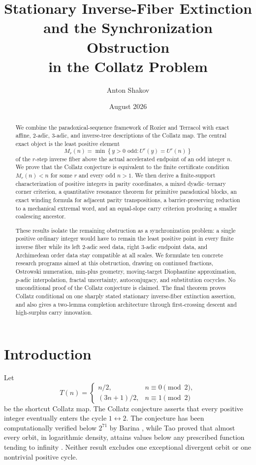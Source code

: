 \documentclass[11pt,reqno]{amsart}
\title[Stationary inverse-fiber extinction]
{Stationary Inverse-Fiber Extinction and the Synchronization Obstruction\\
in the Collatz Problem}
\author{Anton Shakov}
\date{August 2026}
\numberwithin{equation}{section}
\theoremstyle{definition}
\theoremstyle{remark}
\newcommand{\set}[1]{\left\{#1\right\}}
\begin{document}
\begin{abstract}
We combine the paradoxical-sequence framework of Rozier and Terracol with
exact affine, $2$-adic, $3$-adic, and inverse-tree descriptions of the
Collatz map.  The central exact object is the least positive element
\[
M_r(n)=\min\set{y>0\text{ odd}:U^r(y)=U^r(n)}
\]
of the $r$-step inverse fiber above the actual accelerated endpoint of an
odd integer $n$.  We prove that the Collatz conjecture is equivalent to the
finite certificate condition $M_r(n)<n$ for some $r$ and every odd $n>1$.
We then derive a finite-support characterization of positive integers in
parity coordinates, a mixed dyadic--ternary corner criterion, a quantitative
resonance theorem for primitive paradoxical blocks, an exact winding formula
for adjacent parity transpositions, a barrier-preserving reduction to a
mechanical extremal word, and an equal-slope carry criterion producing a
smaller coalescing ancestor.

These results isolate the remaining obstruction as a synchronization problem:
a single positive ordinary integer would have to remain the least positive
point in every finite inverse fiber while its left $2$-adic seed data, right
$3$-adic endpoint data, and Archimedean order data stay compatible at all
scales.  We formulate ten concrete research programs aimed at this
obstruction, drawing on continued fractions, Ostrowski numeration, min-plus
geometry, moving-target Diophantine approximation, $p$-adic interpolation,
fractal uncertainty, autoconjugacy, and substitution cocycles.  No
unconditional proof of the Collatz conjecture is claimed.  The final theorem
proves Collatz conditional on one sharply stated stationary inverse-fiber
extinction assertion, and also gives a two-lemma completion architecture
through first-crossing descent and high-surplus carry innovation.
\end{abstract}

\maketitle

\section{Introduction}

Let
\begin{equation}\label{eq:shortcut-map}
T(n)=
\begin{cases}
 n/2,&n\equiv0\pmod2,\\[1mm]
 (3n+1)/2,&n\equiv1\pmod2
\end{cases}
\end{equation}
be the shortcut Collatz map.  The Collatz conjecture asserts that every
positive integer eventually enters the cycle $1\leftrightarrow2$.  The
conjecture has been computationally verified below $2^{71}$ by Barina
\cite{Barina2025}, while Tao proved that almost every orbit, in logarithmic
density, attains values below any prescribed function tending to infinity
\cite{Tao2022}.  Neither result excludes one exceptional divergent orbit or
one nontrivial positive cycle.
\end{document}

